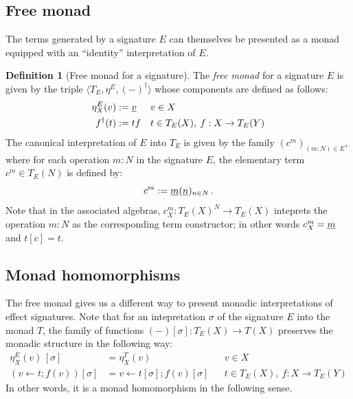 \documentclass[11pt,oneside,draft]{book}
\theoremstyle{definition}
\newtheorem{definition}[theorem]{Definition}
\newcommand{\ul}[1]{%
  \underline{\smash{#1}}
}
\begin{document}

\subsection{Free monad} \label{sec:eff:freemon} %

The terms generated by a signature $E$
can themselves be presented as a monad
equipped with an ``identity'' interpretation of $E$.

\begin{definition}[Free monad for a signature]
The \emph{free monad} for a signature $E$
is given by the triple $\langle T_E, \eta^E, (-)^\dagger \rangle$
whose components are defined as follows:
\begin{align*}
  \eta^E_X(v) &:= \ul{v} && v \in X
  \\
  f^\dagger(t) &:= t f &&
    t \in T_E(X), \:
    f : X \rightarrow T_E(Y)
\end{align*}
The canonical interpretation of $E$ into $T_E$
is given by the family $(c^m)_{(m \mathbin: N) \in E}$,
where for each operation $m \mathbin: N$
in the signature $E$,
the elementary term $c^m \in T_E(N)$
is defined by:
\[
  c^m := \ul{m}(\ul{n})_{n \in N}
  \,.
\]
Note that in the associated algebras,
$c^m_X : T_E(X)^N \rightarrow T_E(X)$
inteprets the operation $m \mathbin: N$
as the corresponding term constructor;
in other words $c^m_X = \ul{m}$ and $t[c] = t$.
\end{definition}


\subsection{Monad homomorphisms} %

The free monad gives us a different way to present
monadic interpretations of effect signatures.
Note that for
an intepretation $\sigma$ of the signature $E$ into the monad $T$,
the family of functions
$(-)[\sigma] : T_E(X) \rightarrow T(X)$
preserves the monadic structure in the following way:
\begin{align*}
  \eta^E_X(v) \, [\sigma] &= \eta^T_X(v)
    && v \in X
  \\
  (v \mathbin\leftarrow t \mathbin; f(v))[\sigma] &=
  v \mathbin\leftarrow t[\sigma] \mathbin; f(v)[\sigma]
    && t \in T_E(X), \: f : X \rightarrow T_E(Y)
\end{align*}
In other words,
it is a monad homomorphism in the following sense.
\end{document}
